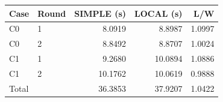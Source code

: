 \begin{tabular}{llrrr}
\toprule
Case & Round & SIMPLE (s) & LOCAL (s) & L/W \\
\midrule
C0 & 1 & 8.0919 & 8.8987 & 1.0997 \\
C0 & 2 & 8.8492 & 8.8707 & 1.0024 \\
C1 & 1 & 9.2680 & 10.0894 & 1.0886 \\
C1 & 2 & 10.1762 & 10.0619 & 0.9888 \\
\midrule
Total & & 36.3853 & 37.9207 & 1.0422 \\
\bottomrule
\end{tabular}

